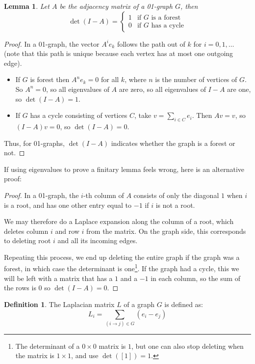 \documentclass[a4paper, 11pt]{article}
\newtheorem{lemma}[theorem]{Lemma}
\theoremstyle{definition}
\newtheorem{definition}{Definition}[section]
\begin{document}
\begin{lemma}
  Let $A$ be the adjacency matrix of a 01-graph $G$, then
  \[
    \det(I-A) = \begin{cases}
      1 & \text{if $G$ is a forest}\\
      0 & \text{if $G$ has a cycle}
    \end{cases}
  \]
\end{lemma}
\begin{proof}
In a 01-graph, the vector $A^i e_k$ follows the path out of $k$ for $i=0,1,\dots$ (note that this path is unique because each vertex has at most one outgoing edge).

\begin{itemize}
  \item If $G$ is forest then $A^n e_k = 0$ for all $k$, where $n$ is the number of vertices of $G$. So $A^n = 0$, so all eigenvalues of $A$ are zero, so all eigenvalues of $I - A$ are one, so $\det(I - A) = 1$.
  \item If $G$ has a cycle consisting of vertices $C$, take $v = \sum_{i \in C} e_i$. Then $Av = v$, so $(I - A)v = 0$, so $\det(I - A) = 0$.
\end{itemize}
Thus, for 01-graphs, $\det(I - A)$ indicates whether the graph is a forest or not.
\end{proof}

If using eigenvalues to prove a finitary lemma feels wrong, here is an alternative proof:
\begin{proof}
In a 01-graph, the $i$-th column of $A$ consists of only the diagonal $1$ when $i$ is a root, and has one other entry equal to $-1$ if $i$ is not a root.

We may therefore do a Laplace expansion along the column of a root, which deletes column $i$ and row $i$ from the matrix. On the graph side, this corresponds to deleting root $i$ and all its incoming edges.

Repeating this process, we end up deleting the entire graph if the graph was a forest, in which case the determinant is one\footnote{The determinant of a $0 \times 0$ matrix is $1$, but one can also stop deleting when the matrix is $1 \times 1$, and use $\det([1]) = 1$.}. If the graph had a cycle, this we will be left with a matrix that has a $1$ and a $-1$ in each column, so the sum of the rows is $0$ so $\det(I - A) = 0$.
\end{proof}

\begin{definition}
  The Laplacian matrix $L$ of a graph $G$ is defined as:
  \[ L_i = \sum_{(i \to j) \in G} (e_i - e_j) \]
\end{definition}
\end{document}
